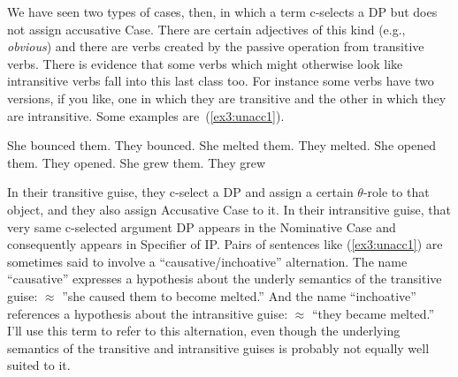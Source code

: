 We have seen two types of cases, then, in which a term c-selects a DP but does not assign accusative Case. There are certain adjectives of this kind (e.g., \emph{obvious}) and there are verbs created by the passive operation from transitive verbs. There is evidence that some verbs which might otherwise look like intransitive verbs fall into this last class too. For instance some verbs have two versions, if you like, one in which they are transitive and the other in which they are intransitive. Some examples are~(\ref{ex3:unacc1}).
\begin{exe}
	\ex \label{ex3:unacc1} 
	\begin{xlist}
		\ex She bounced them.
		\ex They bounced.
		\ex She melted them.
		\ex They melted.
		\ex She opened them.
		\ex They opened.
		\ex She grew them.
		\ex They grew
	\end{xlist}
\end{exe}
In their transitive guise, they c-select a DP and assign a certain $\theta$-role to that object, and they also assign Accusative Case to it. In their intransitive guise, that very same c-selected argument DP appears in the Nominative Case and consequently appears in Specifier of IP. Pairs of sentences like (\ref{ex3:unacc1}) are sometimes said to involve a ``causative/inchoative'' alternation. The name ``causative'' expresses a hypothesis about the underly semantics of the transitive guise:  $\approx$ ''she caused them to become melted.'' And the name ``inchoative'' references a hypothesis about the intransitive guise:  $\approx$ ``they became melted.'' I'll use this term to refer to this alternation, even though the underlying semantics of the transitive and intransitive guises is probably not equally well suited to it.

